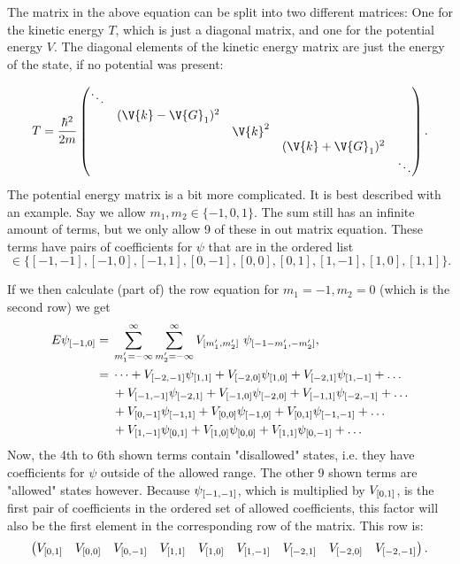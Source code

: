 \documentclass[main.tex]{subfiles}
\begin{document}
	The matrix in the above equation can be split into two different matrices: One for the kinetic energy $ T $, which is just a diagonal matrix, and one for the potential energy $ V $. The diagonal elements of the kinetic energy matrix are just the energy of the state, if no potential was present:
	
	\begin{equation}
		T = \frac{\hbar^2}{2m} \begin{pmatrix}
			\ddots	& 		 			&			& 					& \\
					& (\V{k}-\V{G}_1)^2	& 			& 					& \\
					& 	 				& \V{k}^2	& 					& \\
					&					&			& (\V{k}+\V{G}_1)^2	& \\
					&					&			&					& \ddots
		\end{pmatrix}.
	\end{equation}
	The potential energy matrix is a bit more complicated. It is best described with an example. Say we allow $ m_1, m_2 \in \{-1,0,1\} $. The sum still has an infinite amount of terms, but we only allow 9 of these in out matrix equation. These terms have pairs of coefficients for $ \psi $ that are in the ordered list
	\begin{equation}
		[m_1, m_2] \in \{ [-1, -1], [-1, 0], [-1, 1], [0, -1], [0, 0], [0, 1], [1,-1], [1, 0], [1,1]  \}.
	\end{equation}
	
	If we then calculate (part of) the row equation for $ m_1 = -1, m_2 = 0 $ (which is the second row) we get
	\begin{align*}
		E \psi\coef{-1,0} = {} & \sum_{m'_1 =  -\infty}^{\infty}\sum_{m'_2 = -\infty}^{\infty} V\coef{m'_1, m'_2} \ \psi\coef{-1-m'_1, -m'_2}, \\
		= {} & \dots +  V\coef{-2, -1}\psi\coef{1,1} + V\coef{-2, 0} \psi\coef{1, 0} + V\coef{-2, 1}\psi\coef{1,-1} +  \dots  \\
		& + V\coef{-1, -1} \psi\coef{-2, 1} + V\coef{-1, 0} \psi\coef{-2, 0} + V\coef{-1, 1} \psi\coef{-2, -1} + \dots\\
		& + V\coef{0, -1} \psi\coef{-1, 1} + V\coef{0, 0} \psi\coef{-1, 0} + V\coef{0, 1}\psi\coef{-1, -1} + \dots\\
		&+ V\coef{1, -1} \psi \coef{0,1} + V\coef{1, 0} \psi \coef{0, 0} + V\coef{1,1} \psi \coef{0, -1} + \dots
	\end{align*}
	Now, the 4th to 6th  shown terms contain "disallowed" states, i.e. they have coefficients for $ \psi $ outside of the allowed range. The other 9 shown terms are "allowed" states however. Because $ \psi_{[-1,-1]} $, which is multiplied by $ V_{[0, 1]} $, is the first pair of coefficients in the ordered set of allowed coefficients, this factor will also be the first element in the corresponding row of the matrix. This row is:
	\begin{equation}
		\begin{pmatrix}
			V_{[0, 1]} &  V_{[0, 0]} & V_{[0, -1]} & V_{[1, 1]} & V_{[1, 0]} & V_{[1,-1]} & V_{[-2, 1]} & V_{[-2, 0]} & V_{[-2, -1]}
		\end{pmatrix}.
	\end{equation}
	
\end{document}
